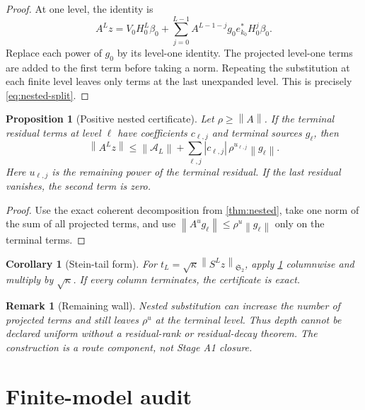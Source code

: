 \documentclass[11pt]{article}
\newtheorem{proposition}[theorem]{Proposition}
\newtheorem{corollary}[theorem]{Corollary}
\newtheorem{remark}[theorem]{Remark}
\newcommand{\norm}[1]{\left\lVert#1\right\rVert}
\newcommand{\HS}{\mathfrak S_2}
\begin{document}
\begin{proof}
At one level, the identity is
\[
 A^Lz=V_0H_0^L\beta_0+
 \sum_{j=0}^{L-1}A^{L-1-j}g_0
 e_{k_0}^*H_0^j\beta_0.
\]
Replace each power of $g_0$ by its level-one identity.  The projected
level-one terms are added to the first term before taking a norm.  Repeating
the substitution at each finite level leaves only terms at the last
unexpanded level.  This is precisely \eqref{eq:nested-split}.
\end{proof}

\begin{proposition}[Positive nested certificate]
\label{prop:positive}
Let $\rho\ge\norm A$.  If the terminal residual terms at level $\ell$ have
coefficients $c_{\ell,j}$ and terminal sources $g_\ell$, then
\begin{equation}
 \norm{A^Lz}
 \le \norm{\mathcal A_L}
 +\sum_{\ell,j}|c_{\ell,j}|\,
 \rho^{u_{\ell,j}}\norm{g_\ell}.
\label{eq:nested-upper}
\end{equation}
Here $u_{\ell,j}$ is the remaining power of the terminal residual.  If the
last residual vanishes, the second term is zero.
\end{proposition}

\begin{proof}
Use the exact coherent decomposition from \cref{thm:nested}, take one norm
of the sum of all projected terms, and use
$\norm{A^u g_\ell}\le\rho^u\norm{g_\ell}$ only on the terminal terms.
\end{proof}

\begin{corollary}[Stein-tail form]
\label{cor:stein}
For $t_L=\sqrt{\kappa}\norm{S^Lz}_{\HS}$, apply
\cref{prop:positive} columnwise and multiply by $\sqrt{\kappa}$.  If every
column terminates, the certificate is exact.
\end{corollary}

\begin{remark}[Remaining wall]
Nested substitution can increase the number of projected terms and still
leaves $\rho^u$ at the terminal level.  Thus depth cannot be declared
uniform without a residual-rank or residual-decay theorem.  The construction
is a route component, not Stage A1 closure.
\end{remark}

\section{Finite-model audit}
\label{sec:audit}
\end{document}
